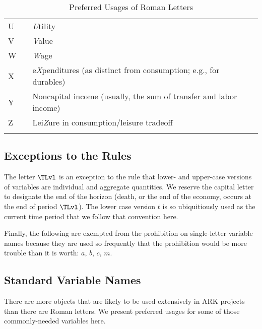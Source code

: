 \documentclass[12pt]{\econtex}
\begin{document}
\begin{table}[ht]
\begin{tabular}{|lcl|}
    U & & \textit{U}tility\\
    V & & \textit{V}alue\\
    W & & \textit{W}age\\
    X & & e\textit{X}penditures (as distinct from consumption; e.g., for durables)\\
    Y & & Noncapital income (usually, the sum of transfer and labor income)\\
    Z & & Lei\textit{Z}ure in consumption/leisure tradeoff\\
  \\ \hline
  \end{tabular}
  \caption{Preferred Usages of Roman Letters}
  \label{table:RomanLetters}
\end{table}

\subsection{Exceptions to the Rules}

The letter $\TLvl$ is an exception to the rule that lower- and upper-case versions of variables are individual and aggregate quantities.  We reserve the capital letter to designate the end of the horizon (death, or the end of the economy, occurs at the end of period $\TLvl$).  The lower case version $t$ is so ubiquitiously used as the current time period that we follow that convention here.

Finally, the following are exempted from the prohibition on single-letter variable names because they are used so frequently that the prohibition would be more trouble than it is worth: $a$, $b$, $c$, $m$.

\pagebreak

\subsection{Standard Variable Names}

There are more objects that are likely to be used extensively in ARK projects than there are Roman letters.  We present preferred usages for some of those commonly-needed variables here.
\end{document}
